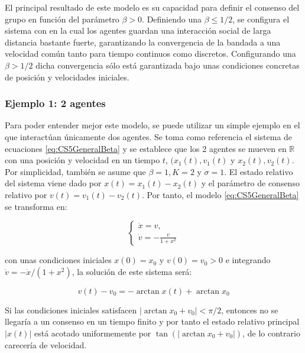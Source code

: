 El principal resultado de este modelo es su capacidad para definir el consenso del grupo en función del parámetro $\beta >0$. Definiendo una $\beta \leq 1/2$, se configura el sistema con en la cual los agentes guardan una interacción social de larga distancia bastante fuerte, garantizando la convergencia de la bandada a una velocidad común tanto para tiempo continuos como discretos.  Configurando una $\beta > 1/2$ dicha convergencia sólo está garantizada bajo unas condiciones concretas de posición y velocidades iniciales.


\subsubsection{Ejemplo 1: 2 agentes}\label{example1}
Para poder entender mejor este modelo, se puede utilizar un simple ejemplo en el que interactúan únicamente dos agentes. Se toma como referencia el sistema de ecuaciones \ref{eq:CS5GeneralBeta} y se establece que los 2 agentes se mueven en $\mathbb{R}$ con una posición y velocidad en un tiempo $t$, $(x_1(t),v_1(t)$ y $x_2(t),v_2(t)$. Por simplicidad, también se asume que $\beta=1, K=2$ y $\sigma=1$. El estado relativo del sistema viene dado por $x(t)=x_1(t)-x_2(t)$ y  el parámetro de consenso relativo por $v(t) = v_1(t) - v_2(t)$. Por tanto, el modelo \ref{eq:CS5GeneralBeta} se transforma en:


\begin{equation*}
    \left\lbrace
    \begin{array}{ll}
        \dot{x}=v ,\\
        \dot{v}= \displaystyle{-\frac{v}{1+x^2}}
    \end{array}
    \right.
\end{equation*}

\noindent con unas condiciones iniciales $x(0)=x_0$ y $v(0)=v_0>0$ e integrando $\dot{v}=-\dot{x}/(1+x^2)$, la solución de este sistema será:

\begin{equation*}
    v(t)-v_0=-\arctan x(t) + \arctan x_0
\end{equation*}


Si las condiciones iniciales satisfacen $|\arctan x_0 + v_0| < \pi/2$, entonces no se llegaría a un consenso en un tiempo finito y por tanto el estado relativo principal $|x(t)|$ está acotado uniformemente por $\tan(|\arctan x_0 +v_0|)$, de lo contrario carecería de velocidad.

